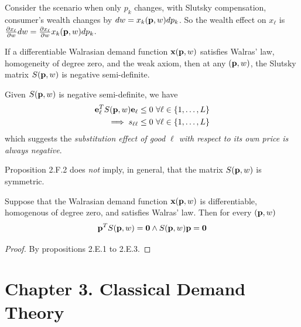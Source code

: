 \documentclass{report}
\begin{document}
 			\begin{remark}
 				Consider the scenario when only $p_k$ changes, with Slutsky compensation, consumer's wealth changes by $dw = x_k(\textbf{p}, w) dp_k$. So the wealth effect on $x_\ell$ is $\frac{\partial{x_\ell}}{\partial{w}} dw = \frac{\partial{x_\ell}}{\partial{w}} x_k(\textbf{p}, w) dp_k$.
 			\end{remark}
 			
 			\begin{proposition}[2.F.2]
 				If a differentiable Walrasian demand function $\textbf{x}(\textbf{p}, w)$ satisfies Walras' law, homogeneity of degree zero, and the weak axiom, then at any $(\textbf{p}, w)$, the Slutsky matrix $S(\textbf{p}, w)$ is negative semi-definite.
 			\end{proposition}
 			
 			\begin{corollary}
 				Given $S(\textbf{p}, w)$ is negative semi-definite, we have
 				\begin{align}
 					\ve{e}_{\ell}^T S(\vep, w) \ve{e}_{\ell} \leq 0\ \forall \ell \in \{1, \ldots, L\} \\
 					\implies s_{\ell \ell} \leq 0\ \forall \ell \in \{1, \ldots, L\}
 				\end{align}
 				which suggests the \emph{substitution effect of good $\ell$ with respect to its own price is always negative}.
 			\end{corollary}
 			
 			\begin{remark}
 				Proposition 2.F.2 does \emph{not} imply, in general, that the matrix $S(\textbf{p}, w)$ is symmetric.
 			\end{remark}
 			
 			\begin{proposition}[2.F.3]
 				Suppose that the Walrasian demand function $\textbf{x}(\textbf{p}, w)$ is differentiable, homogenous of degree zero, and satisfies Walras' law. Then for every $(\textbf{p}, w)$
 				\begin{equation}
 					\textbf{p}^T S(\textbf{p}, w) = \textbf{0} \land S(\textbf{p}, w) \textbf{p} = \textbf{0}
 				\end{equation}
 				\begin{proof}
 					By propositions 2.E.1 to 2.E.3.
 				\end{proof}
 			\end{proposition}
 	
 	\section{Chapter 3. Classical Demand Theory}
\end{document}
